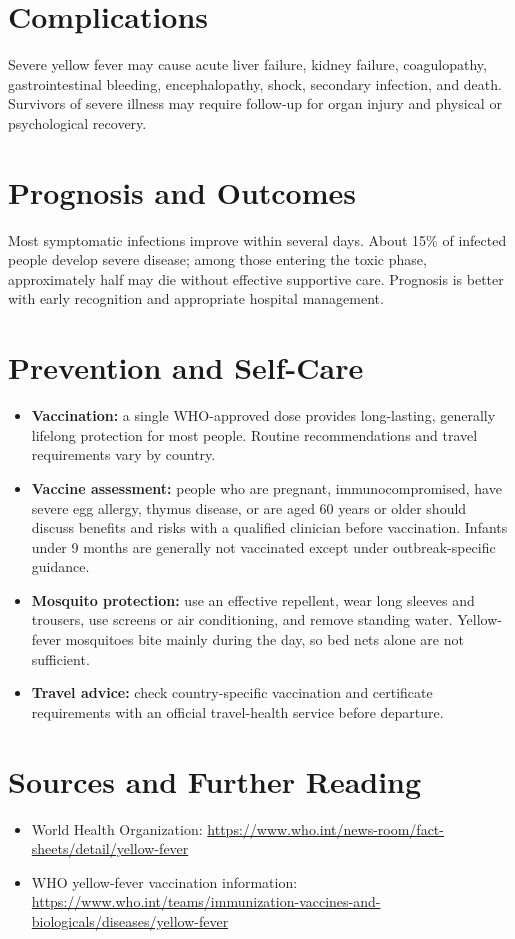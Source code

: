 \section*{Complications}
Severe yellow fever may cause acute liver failure, kidney failure, coagulopathy, gastrointestinal bleeding, encephalopathy, shock, secondary infection, and death. Survivors of severe illness may require follow-up for organ injury and physical or psychological recovery.

\section*{Prognosis and Outcomes}
Most symptomatic infections improve within several days. About 15\% of infected people develop severe disease; among those entering the toxic phase, approximately half may die without effective supportive care. Prognosis is better with early recognition and appropriate hospital management.

\section*{Prevention and Self-Care}
\begin{itemize}
    \item \textbf{Vaccination:} a single WHO-approved dose provides long-lasting, generally lifelong protection for most people. Routine recommendations and travel requirements vary by country.
    \item \textbf{Vaccine assessment:} people who are pregnant, immunocompromised, have severe egg allergy, thymus disease, or are aged 60 years or older should discuss benefits and risks with a qualified clinician before vaccination. Infants under 9 months are generally not vaccinated except under outbreak-specific guidance.
    \item \textbf{Mosquito protection:} use an effective repellent, wear long sleeves and trousers, use screens or air conditioning, and remove standing water. Yellow-fever mosquitoes bite mainly during the day, so bed nets alone are not sufficient.
    \item \textbf{Travel advice:} check country-specific vaccination and certificate requirements with an official travel-health service before departure.
\end{itemize}

\section*{Sources and Further Reading}
\begin{itemize}
    \item World Health Organization: \url{https://www.who.int/news-room/fact-sheets/detail/yellow-fever}
    \item WHO yellow-fever vaccination information: \url{https://www.who.int/teams/immunization-vaccines-and-biologicals/diseases/yellow-fever}
\end{itemize}
